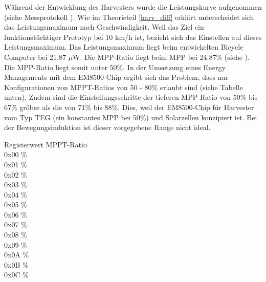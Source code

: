 Während der Entwicklung des Harvesters wurde die Leistungskurve aufgenommen (siehe Messprotokoll \cite{messung_harvester_finish}). Wie im Theorieteil \ref{harv_diff} erklärt unterscheidet sich das Leistungsmaximum nach Geschwindigkeit. Weil das Ziel ein funktionstüchtiger Prototyp bei 10 km/h ist, bezieht sich das Einstellen auf dieses Leistungsmaximum. Das Leistungsmaximum liegt beim entwickelten Bicycle Computer bei 21.87  $\mu$W. Die MPP-Ratio liegt beim MPP bei 24.87\thinspace\% (siehe ). Die MPP-Ratio liegt somit unter 50\thinspace\%. In der Umsetzung eines Energy Managements mit dem EM8500-Chip ergibt sich das Problem, dass nur Konfigurationen von MPPT-Ratios von 50 - 80\thinspace\% erlaubt sind (siehe Tabelle unten). Zudem sind die Einstellungsschritte der tieferen MPP-Ratio von 50\thinspace\% bis 67\thinspace\% gröber als die von 71\thinspace\% bis 88\thinspace\%. Dies, weil der EM8500-Chip für Harvester vom Typ TEG (ein konstantes MPP bei 50\thinspace\%) und Solarzellen konzipiert ist. Bei der Bewegungsinduktion ist dieser vorgegebene Range nicht ideal.

\begin{minipage}{\textwidth}
    \begin{tabbing}
    Registerwert   \quad\= MPPT-Ratio    \\[0.8ex]
    0x00           \thinspace\% \\
    0x01           \thinspace\%\\
    0x02           \thinspace\%\\
    0x03           \thinspace\%\\
    0x04           \thinspace\%\\
    0x05           \thinspace\%\\
    0x06           \thinspace\% \\
    0x07           \thinspace\%\\
    0x08           \thinspace\%\\
    0x09           \thinspace\%\\
    0x0A           \thinspace\% \\
    0x0B           \thinspace\%\\
    0x0C           \thinspace\%\\
    \end{tabbing}
\end{minipage}

